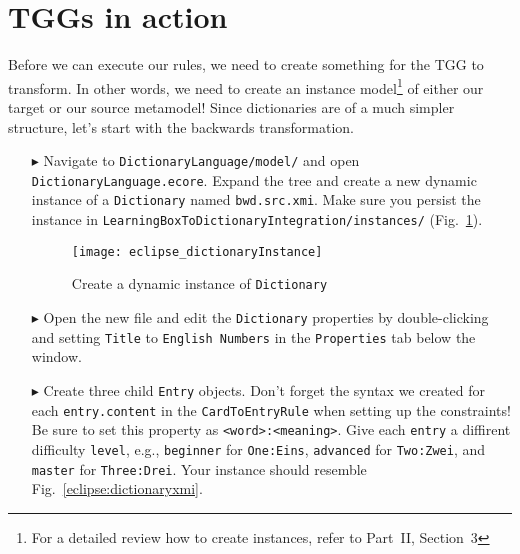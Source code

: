 \newpage
\section{TGGs in action}
\genHeader
\label{sect:TGGs_in_Action}

Before we can execute our rules, we need to create something for the TGG to transform. In other words, we need to create an instance model\footnote{For a
detailed review how to create instances, refer to Part~II, Section~3} of either our target or our source metamodel! Since dictionaries are
of a much simpler structure, let's start with the backwards transformation.

\begin{itemize}

\item[$\blacktriangleright$] Navigate to \texttt{Dictionary\-Language/model/} and open \texttt{Dictio\-nary\-Lang\-uage.ecore}. Expand the tree and create a new
dynamic instance of a \texttt{Dictionary} named \texttt{bwd.src.xmi}. Make sure you persist the instance in
\texttt{Learn\-ing\-Box\-To\-Dictionary\-In\-te\-gra\-tion/in\-stan\-ces/} (Fig.~\ref{eclipse:create_instance_dict}).

\begin{figure}[htbp]
\begin{center}
  \texttt{[image: eclipse\_dictionaryInstance]}
  \caption{Create a dynamic instance of \texttt{Dictionary}}
  \label{eclipse:create_instance_dict}
\end{center}
\end{figure}

\newpage

\item[$\blacktriangleright$] Open the new file and edit the \texttt{Dictionary} properties by double-clicking and setting \texttt{Title} to \texttt{English
Numbers} in the \texttt{Properties} tab below the window.

\vspace{0.5cm}

\item[$\blacktriangleright$] Create three child \texttt{Entry} objects.
Don't forget the syntax we created for each \texttt{entry.content} in the \texttt{CardToEntryRule} when setting up the constraints! 
Be sure to set this property as \texttt{<word>:<meaning>}. Give each \texttt{entry} a diffirent difficulty \texttt{level}, e.g., \texttt{beginner} for \texttt{One:Eins}, \texttt{advanced} for \texttt{Two:Zwei}, and \texttt{master} for \texttt{Three:Drei}.
Your instance should resemble Fig.~\ref{eclipse:dictionaryxmi}.


\end{itemize}
